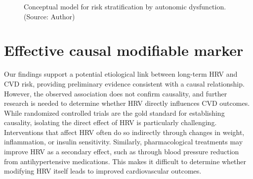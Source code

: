 \documentclass[
  letterpaper,
  headsepline=true,
  open=any]{scrbook}
\begin{document}
\begin{figure}

\begin{minipage}[t]{\linewidth}

{\centering 


\caption{Conceptual model for risk stratification by autonomic
dysfunction. (Source: Author)}

}

\end{minipage}%

\end{figure}

\hypertarget{effective-causal-modifiable-marker}{%
\section{Effective causal modifiable
marker}\label{effective-causal-modifiable-marker}}

Our findings support a potential etiological link between long-term HRV
and CVD risk, providing preliminary evidence consistent with a causal
relationship. However, the observed association does not confirm
causality, and further research is needed to determine whether HRV
directly influences CVD outcomes. While randomized controlled trials are
the gold standard for establishing causality, isolating the direct
effect of HRV is particularly challenging. Interventions that affect HRV
often do so indirectly through changes in weight, inflammation, or
insulin sensitivity. Similarly, pharmacological treatments may improve
HRV as a secondary effect, such as through blood pressure reduction from
antihypertensive medications. This makes it difficult to determine
whether modifying HRV itself leads to improved cardiovascular outcomes.
\end{document}
